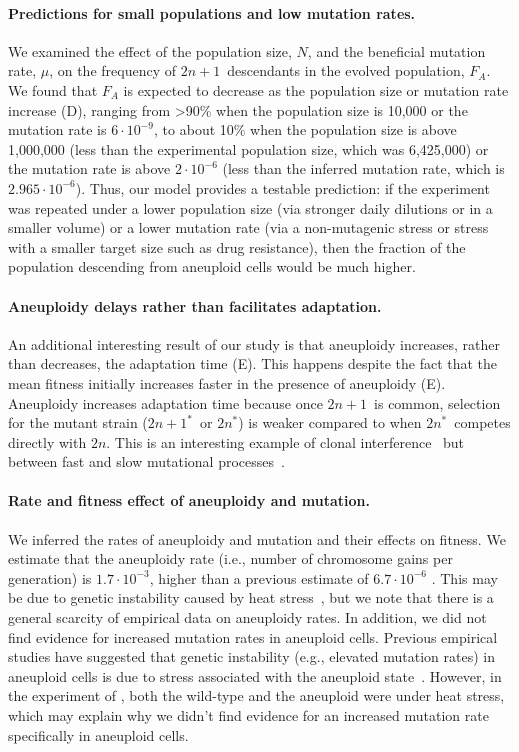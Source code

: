 \documentclass[12pt]{article}
\newcommand{\euwt}{\emph{$2n$}}
\newcommand{\anwt}{\emph{$2n+1$}}
\newcommand{\eumt}{\emph{$2n^*$}}
\newcommand{\anmt}{\emph{$2n+1^*$}}
\begin{document}
\paragraph{Predictions for small populations and low mutation rates.}
We examined the effect of the population size, $N$, and the beneficial mutation rate, $\mu$, on the frequency of \anwt\ descendants in the evolved population, $F_A$.
We found that $F_A$ is expected to decrease as the population size or mutation rate increase (D), ranging from >90\% when the population size is 10,000 or the mutation rate is $6\cdot10^{-9}$, to about 10\% when the population size is above 1,000,000 (less than the experimental population size, which was 6,425,000) or the mutation rate is above $2\cdot10^{-6}$ (less than the inferred mutation rate, which is $2.965\cdot10^{-6}$). 
Thus, our model provides a testable prediction: if the experiment was repeated under a lower population size (via stronger daily dilutions or in a smaller volume) or a lower mutation rate (via a non-mutagenic stress or stress with a smaller target size such as drug resistance), then the fraction of the population descending from aneuploid cells would be much higher.

\paragraph{Aneuploidy delays rather than facilitates adaptation.}
An additional interesting result of our study is that aneuploidy increases, rather than decreases, the adaptation time (E). 
This happens despite the fact that the mean fitness initially increases faster in the presence of aneuploidy (E). 
Aneuploidy increases adaptation time because once \anwt\ is common, selection for the mutant strain (\anmt\ or \eumt) is weaker compared to when \eumt\ competes directly with \euwt.
This is an interesting example of clonal interference~\citep{Good2012} but between fast and slow mutational processes~\citep{Kronholm2016}.

\paragraph{Rate and fitness effect of aneuploidy and mutation.}
We inferred the rates of aneuploidy and mutation and their effects on fitness. 
We estimate that the aneuploidy rate (i.e., number of chromosome gains per generation) is $1.7 \cdot 10^{-3}$, higher than a previous estimate of $6.7 \cdot 10^{-6}$ \citep{Zhu2016}. This may be due to genetic instability caused by heat stress~\citep{Chen2012a}, but we note that there is a general scarcity of empirical data on aneuploidy rates.
In addition, we did not find evidence for increased mutation rates in aneuploid cells. 
Previous empirical studies have suggested that genetic instability (e.g., elevated mutation rates) in aneuploid cells is due to stress associated with the aneuploid state~\citep{Bouchonville2009, Chen2012b, Zhu2012, Ippolito2021b}.
However, in the experiment of \citet{Yona2012}, both the wild-type and the aneuploid were under heat stress, which may explain why we didn't find evidence for an increased mutation rate specifically in aneuploid cells.
\end{document}
